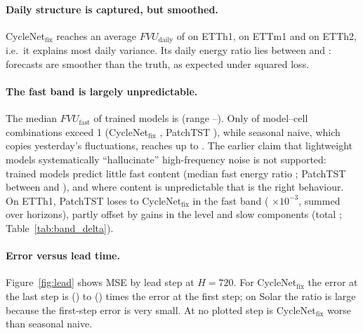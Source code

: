 \documentclass[11pt,a4paper]{article}
\begin{document}
\paragraph{Daily structure is captured, but smoothed.}
CycleNet$_{\text{fix}}$ reaches an average $FVU_{\text{daily}}$ of \vDailyFvuFixedETThOne{} on ETTh1, \vDailyFvuFixedETTmOne{} on ETTm1 and \vDailyFvuFixedETThTwo{} on ETTh2, i.e.\ it explains most daily variance. Its daily energy ratio lies between \vDailyErFixedMin{} and \vDailyErFixedMax: forecasts are smoother than the truth, as expected under squared loss.

\paragraph{The fast band is largely unpredictable.}
The median $FVU_{\text{fast}}$ of trained models is \vFastFvuMedian{} (range \vFastFvuMin--\vFastFvuMax). Only \vFastFvuGtOne{} of \vFastFvuCells{} model--cell combinations exceed 1 (CycleNet$_{\text{fix}}$ \vFastFvuFixedGtOne, PatchTST \vFastFvuPatchGtOne), while seasonal naive, which copies yesterday's fluctuations, reaches up to \vFastFvuSnaiveMax. The earlier claim that lightweight models systematically ``hallucinate'' high-frequency noise is not supported: trained models predict little fast content (median fast energy ratio \vFastErMedian; PatchTST between \vFastEnergyPatchMin{} and \vFastEnergyPatchMax), and where content is unpredictable that is the right behaviour. On ETTh1, PatchTST loses to CycleNet$_{\text{fix}}$ in the fast band (\vPatchETThOneFast{} $\times10^{-3}$, summed over horizons), partly offset by gains in the level and slow components (total \vPatchETThOneTotal; Table~\ref{tab:band_delta}).

\paragraph{Error versus lead time.}
Figure~\ref{fig:lead} shows MSE by lead step at $H=720$. For CycleNet$_{\text{fix}}$ the error at the last step is \vLeadRatioMin{} (\vLeadRatioMinWhere) to \vLeadRatioMax{} (\vLeadRatioMaxWhere) times the error at the first step; on Solar the ratio is large because the first-step error is very small. At no plotted step is CycleNet$_{\text{fix}}$ worse than seasonal naive.
\end{document}
